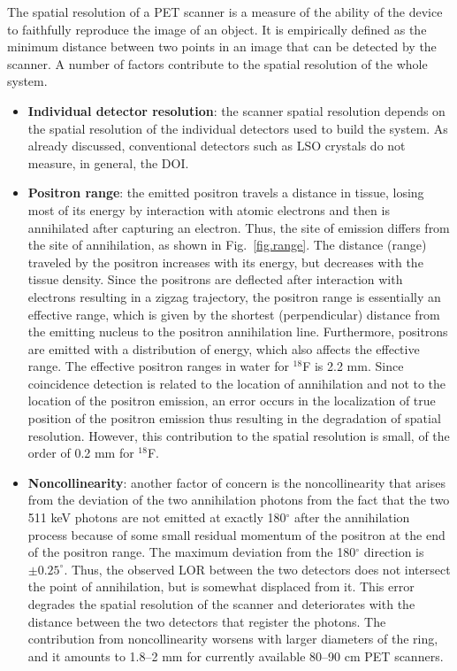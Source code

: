 The spatial resolution of a PET scanner is a measure of the ability of the device to faithfully reproduce the image of an object. It is empirically defined as the minimum distance between two points in an image that can be detected by the scanner. A number of factors contribute to the spatial resolution of the whole system.
\begin{itemize}
\item {\bf Individual detector resolution}: the scanner spatial resolution depends on the spatial resolution of the individual detectors used to build the system. As already discussed, conventional detectors such as LSO crystals do not measure, in general, the DOI.   
\item {\bf Positron range}: the emitted positron travels a distance in tissue, losing most of its energy by interaction with atomic electrons and then is annihilated after capturing an electron. Thus, the site of emission differs from the site of annihilation, as shown in Fig.~\ref{fig.range}. The distance (range) traveled by the positron increases with its energy, but decreases with the tissue density. Since the positrons are deflected after interaction with electrons resulting in a zigzag trajectory, the positron range is essentially an effective range, which is given by the shortest (perpendicular) distance from the emitting nucleus to the positron annihilation line. Furthermore, positrons are emitted with a distribution of energy, which also affects the effective range. The effective positron ranges in water for \ensuremath{^{18}}F is 2.2 mm. Since coincidence detection is related to the location of annihilation and not to the location of the positron emission, an error  occurs in the localization of true position of the positron emission thus resulting in the degradation of spatial resolution. However, this contribution to the spatial resolution is small, of the order of 0.2 mm for \ensuremath{^{18}}F.
\item {\bf Noncollinearity}: another factor of concern is the noncollinearity that arises from the deviation of the two annihilation photons from the fact that the two 511 keV photons are not emitted at exactly 180$^\circ$ after the annihilation process because of some small residual momentum of the positron at the end of the positron range. The maximum deviation from the 180$^\circ$ direction is $\pm 0.25^\circ$. Thus, the observed LOR between the two detectors does not intersect the point of annihilation, but is somewhat displaced from it. This error  degrades the spatial resolution of the scanner and deteriorates with the distance between the two detectors that register the photons. The contribution from noncollinearity worsens with larger diameters of the ring, and it amounts to 1.8--2 mm for currently available 80--90 cm PET scanners.
\end{itemize}

